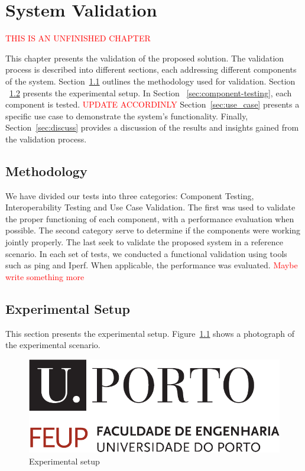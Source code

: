 \chapter{System Validation}\label{ch:validation}

\textcolor{red}{THIS IS AN UNFINISHED CHAPTER}

This chapter presents the validation of the proposed solution.
The validation process is described into different sections, each addressing different components of the system.
Section~\ref{sec:meth} outlines the methodology used for validation.
Section ~\ref{sec:experimental-setup} presents the experimental setup.
In Section ~\ref{sec:component-testing}, each component is tested.
\textcolor{red}{UPDATE ACCORDINLY}
Section~\ref{sec:use_case} presents a specific use case to demonstrate the system's functionality.
Finally, Section~\ref{sec:discuss} provides a discussion of the results and insights gained from the validation process.

\section{Methodology}\label{sec:meth}
We have divided our tests into three categories: Component Testing, Interoperability Testing and Use Case Validation.
The first was used to validate the proper functioning of each component, with a performance evaluation when possible.
The second category serve to determine if the components were working jointly properly.
The last seek to validate the proposed system in a reference scenario.
In each set of tests, we conducted a functional validation using tools such as ping and Iperf.
When applicable, the performance was evaluated.
\textcolor{red}{Maybe write something more}

\section{Experimental Setup}\label{sec:experimental-setup}
This section presents the experimental setup.
Figure~\ref{fig:setup} shows a photograph of the experimental scenario.

\begin{figure}[H]
    \centering
    \includegraphics[width=0.5\linewidth]{figures/uporto-feup}
    \caption{Experimental setup}
    \label{fig:setup}
\end{figure}


